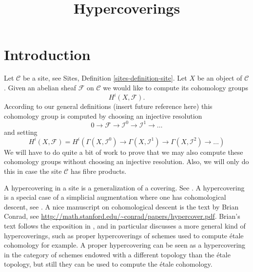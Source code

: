 

%


\title{Hypercoverings}


\maketitle

\label{section-phantom}

\tableofcontents

\section{Introduction}
\label{section-introduction}

\noindent
Let $\mathcal{C}$ be a site, see Sites, Definition \ref{sites-definition-site}.
Let $X$ be an object of $\mathcal{C}$.
Given an abelian sheaf $\mathcal{F}$
on $\mathcal{C}$ we would like to compute
its cohomology groups
$$
H^i(X, \mathcal{F}).
$$
According to our general definitions
(insert future reference here)
this cohomology group is computed by
choosing an injective resolution
$$
0 \to \mathcal{F} \to \mathcal{I}^0 \to \mathcal{I}^1 \to \ldots
$$
and setting
$$
H^i(X, \mathcal{F})
=
H^i(
\Gamma(X, \mathcal{I}^0) \to
\Gamma(X, \mathcal{I}^1) \to
\Gamma(X, \mathcal{I}^2)\to \ldots)
$$
We will have to do quite a bit of work to prove that we
may also compute these cohomology groups without
choosing an injective resolution. Also, we will only do this
in case the site $\mathcal{C}$ has fibre products.

\medskip\noindent
A hypercovering in a site is a generalization of a covering.
See \cite[Expos\'e V, Sec. 7]{SGA4}. A hypercovering is a special
case of a simplicial augmentation where one has cohomological
descent, see \cite[Expos\'e Vbis]{SGA4}. A nice manuscript on
cohomological descent is the text by Brian Conrad, see
\url{http://math.stanford.edu/~conrad/papers/hypercover.pdf}.
Brian's text follows the exposition in \cite[Expos\'e Vbis]{SGA4}, and in
particular discusses a more general kind of hypercoverings, such as
proper hypercoverings of schemes used to compute \'etale cohomology
for example. A proper hypercovering can be seen as a hypercovering
in the category of schemes endowed with a different topology than
the \'etale topology, but still they can be used to compute the \'etale
cohomology.





























